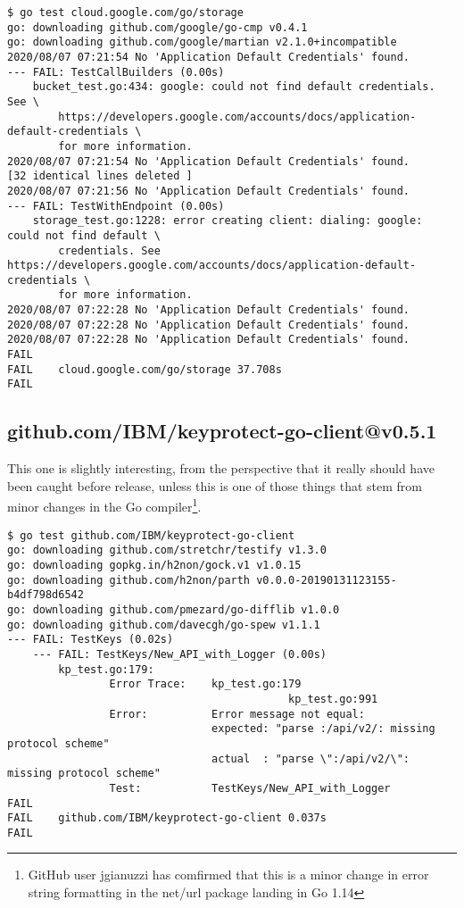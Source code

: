 \documentclass[a4paper]{paper}
\begin{document}
\begin{verbatim}
$ go test cloud.google.com/go/storage
go: downloading github.com/google/go-cmp v0.4.1
go: downloading github.com/google/martian v2.1.0+incompatible
2020/08/07 07:21:54 No 'Application Default Credentials' found.
--- FAIL: TestCallBuilders (0.00s)
    bucket_test.go:434: google: could not find default credentials. See \
        https://developers.google.com/accounts/docs/application-default-credentials \
        for more information.
2020/08/07 07:21:54 No 'Application Default Credentials' found.
[32 identical lines deleted ]
2020/08/07 07:21:56 No 'Application Default Credentials' found.
--- FAIL: TestWithEndpoint (0.00s)
    storage_test.go:1228: error creating client: dialing: google: could not find default \
        credentials. See https://developers.google.com/accounts/docs/application-default-credentials \
        for more information.
2020/08/07 07:22:28 No 'Application Default Credentials' found.
2020/08/07 07:22:28 No 'Application Default Credentials' found.
2020/08/07 07:22:28 No 'Application Default Credentials' found.
FAIL
FAIL	cloud.google.com/go/storage	37.708s
FAIL
\end{verbatim}

\subsection{github.com/IBM/keyprotect-go-client@v0.5.1}

This one is slightly interesting, from the perspective that it really
should have been caught before release, unless this is one of those
things that stem from minor changes in the Go compiler\footnote{GitHub user jgianuzzi has comfirmed that this is a minor change in error string formatting in the net/url package landing in Go 1.14}.

\begin{verbatim}
$ go test github.com/IBM/keyprotect-go-client
go: downloading github.com/stretchr/testify v1.3.0
go: downloading gopkg.in/h2non/gock.v1 v1.0.15
go: downloading github.com/h2non/parth v0.0.0-20190131123155-b4df798d6542
go: downloading github.com/pmezard/go-difflib v1.0.0
go: downloading github.com/davecgh/go-spew v1.1.1
--- FAIL: TestKeys (0.02s)
    --- FAIL: TestKeys/New_API_with_Logger (0.00s)
        kp_test.go:179: 
            	Error Trace:	kp_test.go:179
            	            				kp_test.go:991
            	Error:      	Error message not equal:
            	            	expected: "parse :/api/v2/: missing protocol scheme"
            	            	actual  : "parse \":/api/v2/\": missing protocol scheme"
            	Test:       	TestKeys/New_API_with_Logger
FAIL
FAIL	github.com/IBM/keyprotect-go-client	0.037s
FAIL
\end{verbatim}
\end{document}
